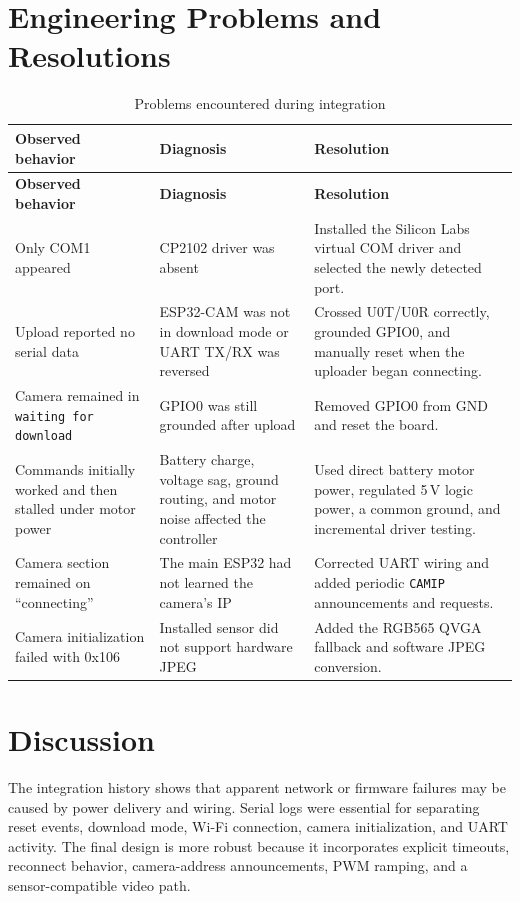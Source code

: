 \documentclass[12pt,a4paper,oneside]{report}
\newcommand{\code}[1]{\texttt{#1}}
\begin{document}
\section{Engineering Problems and Resolutions}
\begin{longtable}{p{3.6cm}p{5.0cm}p{6.4cm}}
  \caption{Problems encountered during integration}
  \label{tab:problems}\\
  \toprule
  \textbf{Observed behavior} & \textbf{Diagnosis} & \textbf{Resolution} \\
  \midrule
  \endfirsthead
  \toprule
  \textbf{Observed behavior} & \textbf{Diagnosis} & \textbf{Resolution} \\
  \midrule
  \endhead
  Only COM1 appeared & CP2102 driver was absent & Installed the Silicon Labs
  virtual COM driver and selected the newly detected port. \\
  Upload reported no serial data & ESP32-CAM was not in download mode or UART
  TX/RX was reversed & Crossed U0T/U0R correctly, grounded GPIO0, and manually
  reset when the uploader began connecting. \\
  Camera remained in \code{waiting for download} & GPIO0 was still grounded
  after upload & Removed GPIO0 from GND and reset the board. \\
  Commands initially worked and then stalled under motor power & Battery charge,
  voltage sag, ground routing, and motor noise affected the controller & Used
  direct battery motor power, regulated 5\,V logic power, a common ground, and
  incremental driver testing. \\
  Camera section remained on ``connecting'' & The main ESP32 had not learned the
  camera's IP & Corrected UART wiring and added periodic \code{CAMIP}
  announcements and requests. \\
  Camera initialization failed with 0x106 & Installed sensor did not support
  hardware JPEG & Added the RGB565 QVGA fallback and software JPEG conversion. \\
  \bottomrule
\end{longtable}

\section{Discussion}
The integration history shows that apparent network or firmware failures may be
caused by power delivery and wiring. Serial logs were essential for separating
reset events, download mode, Wi-Fi connection, camera initialization, and UART
activity. The final design is more robust because it incorporates explicit
timeouts, reconnect behavior, camera-address announcements, PWM ramping, and a
sensor-compatible video path.
\end{document}
